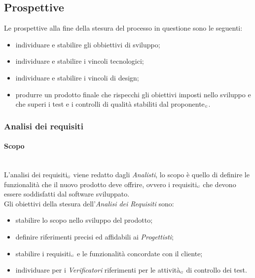 \subsection{Prospettive}\label{ProcessiPrimariProspettive}
Le prospettive alla fine della stesura del processo in questione sono le seguenti:
\begin{itemize}
	\item individuare e stabilire gli obbiettivi di sviluppo;
	\item individuare e stabilire i vincoli tecnologici;
	\item individuare e stabilire i vincoli di design;
	\item produrre un prodotto finale che rispecchi gli obiettivi imposti nello sviluppo e che superi i test e i controlli di qualità stabiliti dal proponente$_{\scaleto{G}{3pt}}$.
\end{itemize}
\subsubsection{Analisi dei requisiti}\label{ProcessiPrimariProspettiveAnalisiDeiRequisiti}
\paragraph{Scopo}\label{ProcessiPrimariProspettiveAnalisiDeiRequisitiScopo}\mbox{}\\
L'analisi dei requisiti$_{\scaleto{G}{3pt}}$ viene redatto dagli \textit{Analisti}, lo scopo è quello di definire le funzionalità che il nuovo prodotto deve offrire, ovvero i requisiti$_{\scaleto{G}{3pt}}$ che devono essere soddisfatti dal software sviluppato.\\
Gli obiettivi della stesura dell'\textit{Analisi dei Requisiti} sono:
\begin{itemize}
	\item stabilire lo scopo nello sviluppo del prodotto;
	\item definire riferimenti precisi ed affidabili ai \textit{Progettisti};
	\item stabilire i requisiti$_{\scaleto{G}{3pt}}$ e le funzionalità concordate con il cliente;
	\item individuare per i \textit{Verificatori} riferimenti per le attività$_{\scaleto{G}{3pt}}$ di controllo dei test.
\end{itemize}
